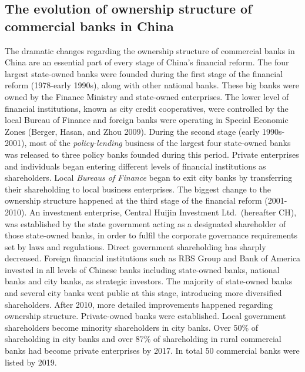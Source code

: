 \documentclass{article}
\begin{document}
\hypertarget{the-evolution-of-ownership-structure-of-commercial-banks-in-china}{%
\subsection{The evolution of ownership structure of commercial banks in
China}\label{the-evolution-of-ownership-structure-of-commercial-banks-in-china}}

The dramatic changes regarding the ownership structure of commercial
banks in China are an essential part of every stage of China's financial
reform. The four largest state-owned banks were founded during the first
stage of the financial reform (1978-early 1990s), along with other
national banks. These big banks were owned by the Finance Ministry and
state-owned enterprises. The lower level of financial institutions,
known as city credit cooperatives, were controlled by the local Bureau
of Finance and foreign banks were operating in Special Economic Zones
(Berger, Hasan, and Zhou 2009). During the second stage (early
1990s-2001), most of the \emph{policy-lending} business of the largest
four state-owned banks was released to three policy banks founded during
this period. Private enterprises and individuals began entering
different levels of financial institutions as shareholders. Local
\emph{Bureaus of Finance} began to exit city banks by transferring their
shareholding to local business enterprises. The biggest change to the
ownership structure happened at the third stage of the financial reform
(2001-2010). An investment enterprise, Central Huijin Investment
Ltd.~(hereafter CH), was established by the state government acting as a
designated shareholder of those state-owned banks, in order to fulfil
the corporate governance requirements set by laws and regulations.
Direct government shareholding has sharply decreased. Foreign financial
institutions such as RBS Group and Bank of America invested in all
levels of Chinese banks including state-owned banks, national banks and
city banks, as strategic investors. The majority of state-owned banks
and several city banks went public at this stage, introducing more
diversified shareholders. After 2010, more detailed improvements
happened regarding ownership structure. Private-owned banks were
established. Local government shareholders become minority shareholders
in city banks. Over 50\% of shareholding in city banks and over 87\% of
shareholding in rural commercial banks had become private enterprises by
2017. In total 50 commercial banks were listed by 2019.
\end{document}
